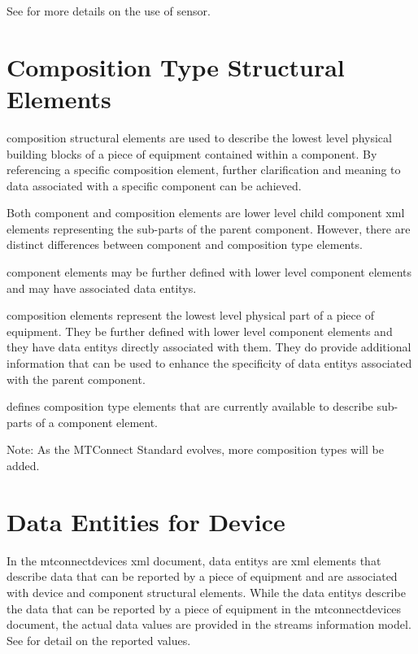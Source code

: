 See  for more details on the use of \gls{sensor}.

\section{Composition Type Structural Elements}
\label{sec:Composition Type Structural Elements}

\gls{composition} \glspl{structural element} are used to describe the lowest level physical building blocks of a piece of equipment contained within a \gls{component}. By referencing a specific \gls{composition} element, further clarification and meaning to data associated with a specific \gls{component} can be achieved.

Both \gls{component} and \gls{composition} elements are \gls{lower level} child \gls{component} \gls{xml} elements representing the sub-parts of the parent \gls{component}.  However, there are distinct differences between \gls{component} and \gls{composition} type elements.

\gls{component} elements may be further defined with \gls{lower level} \gls{component} elements and may have associated \glspl{data entity}.

\gls{composition} elements represent the lowest level physical part of a piece of equipment.  They \mustnot be further defined with \gls{lower level} \gls{component} elements and they \mustnot have \glspl{data entity} directly associated with them.   They do provide additional information that can be used to enhance the specificity of \glspl{data entity} associated with the parent \gls{component}.

 defines \gls{composition} type elements that are currently available to describe sub-parts of a \gls{component} element.



\begin{note}
Note:  As the MTConnect Standard evolves, more \gls{composition} types will be added.

\end{note}

\section {Data Entities for Device}
\label{sec:Data Entities for Device}

In the \gls{mtconnectdevices} \gls{xml} document, \glspl{data entity} are \gls{xml} elements that describe data that can be reported by a piece of equipment and are associated with \gls{device} and \gls{component} \glspl{structural element}.   While the \glspl{data entity} describe the data that can be reported by a piece of equipment in the \gls{mtconnectdevices} document, the actual data values are provided in the \gls{streams information model}.   See  for detail on the reported values.

